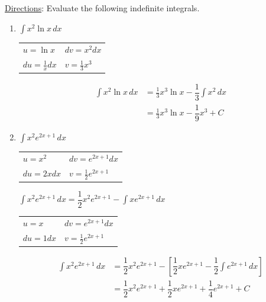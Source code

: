 \documentclass{article}
\begin{document}
 \pspace{\newpage}
\underline{Directions}: Evaluate the following indefinite integrals.
\begin{enumerate}
\item $\displaystyle \int x^2\ln x \,dx$

\begin{solution}
\begin{center}
    \begin{tabular}{ l l }
  $u=\ln x$ &  $dv = x^2 dx$  \\
  $du=\frac{1}{x}dx$ &  $v=\frac{1}{3}x^3$  \\
\end{tabular}
\begin{align*}
\displaystyle \int x^2\ln x \,dx&=\frac{1}{3}x^3\ln x - \displaystyle \dfrac{1}{3}\int x^2 \,dx \\&= \frac{1}{3}x^3\ln x - \dfrac{1}{9}x^3+C
\end{align*}
\end{center} 
\end{solution}
\vfill
\item $\displaystyle \int x^2e^{2x+1}\,dx$

\begin{solution}
\begin{center}
    \begin{tabular}{ l l }
  $u=x^2$ &  $dv = e^{2x+1} dx$  \\
  $du=2xdx$ &  $v=\frac{1}{2}e^{2x+1}$  \\
\end{tabular}
 
$\displaystyle \int x^2e^{2x+1}\,dx=\dfrac{1}{2}x^2e^{2x+1}-\displaystyle \int xe^{2x+1}\,dx$
\end{center} 
\begin{center}
    \begin{tabular}{ l l }
  $u=x$ &  $dv = e^{2x+1} dx$  \\
  $du=1dx$ &  $v=\frac{1}{2}e^{2x+1}$  \\
\end{tabular}

\begin{align*}
\displaystyle \int x^2e^{2x+1}\,dx&=\dfrac{1}{2}x^2e^{2x+1}-\left[\dfrac{1}{2}xe^{2x+1}-\dfrac{1}{2}\int e^{2x+1}\,dx\right]\\
&=\dfrac{1}{2}x^2e^{2x+1}+\dfrac{1}{2}xe^{2x+1}+\dfrac{1}{4}e^{2x+1}+C
\end{align*}
\end{center}
\end{solution}
\vfill


\end{enumerate}
\end{document}
